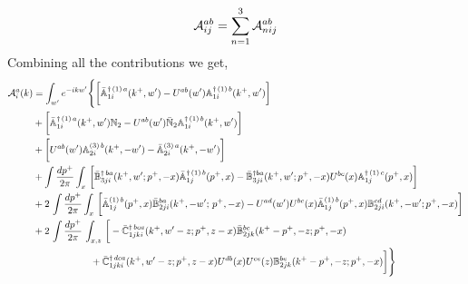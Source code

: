 \documentclass[aps,prd,amsmath,amssymb,nofootinbib]{revtex4-2}
\def\mf#1{\mathbb{#1}}
\numberwithin{equation}{section}
\begin{document}
\begin{align}
    {\cal A}^{ab}_{ij} = \sum_{n=1}^3 {\cal A}^{ab}_{n ij} 
\end{align}
Combining all the contributions we get,
    \begin{align}
         {\cal A}^{a}_{i}(k) & = \int_{w^{\prime}}e^{-ikw^{\prime}} \Bigg\{\bigg[\bar{\mf{A}}^{\dagger\,(1)\,a}_{1i}(k^{+},w^{\prime})-U^{ab}(w^{\prime})\mf{A}^{\dagger\, (1)\, b}_{1i}(k^{+},
         w^{\prime})\bigg]\notag \\ & +\bigg[\bar{\mf{A}}^{\dagger\,(1)\,a}_{1i}(k^{+},w^{\prime})\mf{N}_{2} -U^{ab}(w^{\prime})\bar{\mf{N}}_{2}\mf{A}^{\dagger\, (1)\, b}_{1i}(k^{+},w^{\prime})\bigg]\notag 
         \\ & +\bigg[U^{ab}(w^{\prime})\mf{A}^{(3)\, b}_{2i}(k^{+},- w^{\prime})-\Bar{\mf{A}}^{(3)\, a}_{2i}(k^{+}, - w^{\prime})\bigg]\notag 
         \\ & 
         +\int \frac{dp^{+}}{2\pi}\int_{x}\,\bigg[\Bar{\mf{B}}^{\dagger\, ba}_{3ji}(k^{+}, w^{\prime}; p^{+}, -x)\Bar{\mf{A}}^{\dagger\, (1)\,b}_{1j}(p^{+}, x)
         -\Bar{\mf{B}}^{\dagger ba}_{3ji}(k^{+},w^{\prime}; p^{+},-x) U^{bc}(x) \mf{A}^{\dagger\,(1)\, c}_{1j}(p^{+},x)\bigg]\notag
         \\ & 
         +2\,\int \frac{dp^{+}}{2\pi}\int_{x}\,\bigg[ \Bar{\mf{A}}^{(1)\, b}_{1j}(p^{+}, x)\Bar{\mf{B}}^{ba}_{2ji}(k^{+},-w^{\prime};\,p^{+}, -x) -U^{ad}(w^\prime)U^{bc}(x) \bar{\mf{A}}^{(1)\, b}_{1j}(p^+,x) {\mf{B}}^{cd}_{2ji} (k^+, -w^\prime;p^+, -x)\bigg]\notag 
         \\ & 
         +2\, \int \frac{dp^{+}}{2\pi}\,\int_{x,z}\, \bigg[-\Bar{\mf{C}}^{\dagger\, bca}_{1jki}(k^{+},w^{\prime}-z;p^{+},z-x)\Bar{\mf{B}}^{bc}_{2jk}(k^{+}-p^{+},- z;p^{+},-x)
         \notag \\ & \qquad \qquad \qquad  +\bar{\mf{C}}^{\dagger\, dca}_{1jki}(k^+,w^\prime-z; p^+, z-x)  
                 U^{db}(x)
                 U^{ce}(z) 
                {\mf{B}}^{be}_{2jk} (k^{+}-p^+, -z; p^+, -x) \bigg] \Bigg\}
   \end{align}
\end{document}
